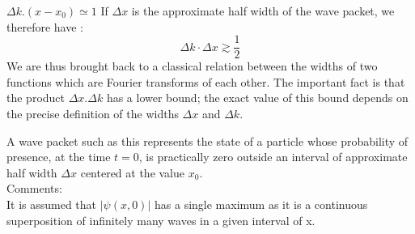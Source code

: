 \documentclass[%
 reprint,
 amsmath,amssymb,
 aps,
]{revtex4-2}
\begin{document}
$\Delta k .\left(x-x_0\right) \simeq 1$
If $\Delta x$ is the approximate  half width of the wave packet, we therefore have :
\begin{equation}
\Delta k \cdot \Delta x \gtrsim\frac{1}{2} 
\end{equation}
We are thus brought back to a classical relation between the widths of two functions which are Fourier transforms of each other. The important fact is that the product $\Delta x. \Delta k$ has a lower bound; the exact value of this bound depends on the precise definition of the widths $\Delta x$ and $\Delta k$.

A wave packet such as this represents the state of a particle whose probability of presence, at the time $t=0$, is practically zero outside an interval of approximate half width $\Delta x$ centered at the value $x_0$.\\
Comments:\\
It is assumed that $|\psi(x, 0)|$ has a single maximum as it is a  continuous superposition of infinitely many waves in a given interval of x. 
\end{document}
